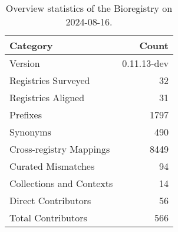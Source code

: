 \begin{table}
\caption{Overview statistics of the Bioregistry on 2024-08-16.}
\label{tab:bioregistry-summary}
\begin{tabular}{lr}
\toprule
Category & Count \\
\midrule
Version & 0.11.13-dev \\
Registries Surveyed & 32 \\
Registries Aligned & 31 \\
Prefixes & 1797 \\
Synonyms & 490 \\
Cross-registry Mappings & 8449 \\
Curated Mismatches & 94 \\
Collections and Contexts & 14 \\
Direct Contributors & 56 \\
Total Contributors & 566 \\
\bottomrule
\end{tabular}
\end{table}
